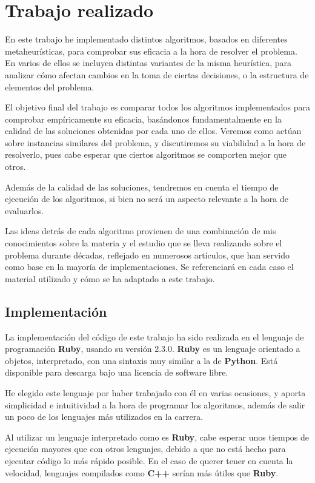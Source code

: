 \section{Trabajo realizado}

En este trabajo he implementado distintos algoritmos, basados en diferentes
metaheurísticas, para comprobar sus eficacia a la hora de resolver el problema.
En varios de ellos se incluyen distintas variantes de la misma heurística, para
analizar cómo afectan cambios en la toma de ciertas decisiones, o la estructura
de elementos del problema.

El objetivo final del trabajo es comparar todos los algoritmos implementados
para comprobar empíricamente su eficacia, basándonos fundamentalmente en la
calidad de las soluciones obtenidas por cada uno de ellos. Veremos como actúan
sobre instancias similares del problema, y discutiremos su viabilidad a la
hora de resolverlo, pues cabe esperar que ciertos algoritmos se comporten
mejor que otros.

Además de la calidad de las soluciones, tendremos en cuenta el tiempo de ejecución
de los algoritmos, si bien no será un aspecto relevante a la hora de evaluarlos.

Las ideas detrás de cada algoritmo provienen de una combinación de mis conocimientos
sobre la materia y el estudio que se lleva realizando sobre el problema durante décadas,
reflejado en numerosos artículos, que han servido como base en la mayoría de implementaciones.
Se referenciará en cada caso el material utilizado y cómo se ha adaptado a este trabajo.

\subsection{Implementación}

La implementación del código de este trabajo ha sido realizada en el lenguaje de
programación \textbf{Ruby}, usando su versión 2.3.0. \textbf{Ruby} es un lenguaje
orientado a objetos, interpretado, con una sintaxis muy similar a la de \textbf{Python}.
Está disponible para descarga bajo una licencia de software libre.

He elegido este lenguaje por haber trabajado con él en varias ocasiones, y aporta
simplicidad e intuitividad a la hora de programar los algoritmos, además de salir
un poco de los lenguajes más utilizados en la carrera.

Al utilizar un lenguaje interpretado como es \textbf{Ruby}, cabe esperar unos
tiempos de ejecución mayores que con otros lenguajes, debido a que no está hecho
para ejecutar código lo más rápido posible. En el caso de querer tener en cuenta la
velocidad, lenguajes compilados como \textbf{C++} serían más útiles que \textbf{Ruby}.

